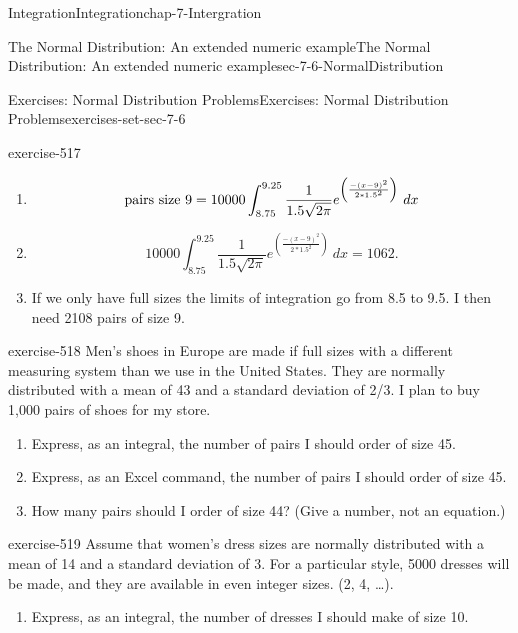 \documentclass[oneside,10pt,]{book}
\numberwithin{equation}{section}
\begin{document}
\begin{chapterptx}{Integration}{}{Integration}{}{}{chap-7-Intergration}
\begin{sectionptx}{The Normal Distribution: An extended numeric example}{}{The Normal Distribution: An extended numeric example}{}{}{sec-7-6-NormalDistribution}
\begin{exercises-subsection-numberless}{Exercises: Normal Distribution Problems}{}{Exercises: Normal Distribution Problems}{}{}{exercises-set-sec-7-6}
\begin{divisionexercise}{1}{}{}{exercise-517}
\leavevmode%
\begin{enumerate}[label=(\alph*)]
\textgreater{} \item\hypertarget{li-774}{}%
\begin{equation*}
\hbox{pairs size 9}=10000\int_{8.75}^{9.25}
\frac{1}{1.5\sqrt{2\pi}}e^{\left({\frac{-(x-9)^2}{2*1.5^2}}\right)}\ dx
\end{equation*}
%
\item\hypertarget{li-775}{}%
\begin{equation*}
10000\int_{8.75}^{9.25} \frac{1}{1.5\sqrt{2\pi}} e^{\left({\frac{-(x-9)^2}{2*1.5^2}}\right)}\ dx=1062.
\end{equation*}
%
\item\hypertarget{li-776}{}\hypertarget{p-2969}{}%
If we only have full sizes the limits of integration go from 8.5 to 9.5.  I then need 2108 pairs of size 9.%
\end{enumerate}
\end{divisionexercise}%
\begin{divisionexercise}{2}{}{}{exercise-518}%
\hypertarget{p-2970}{}%
Men's shoes in Europe are made if full sizes with a different measuring system than we use in the United States.  They are normally distributed with a mean of 43 and a standard deviation of 2\slash{}3.  I plan to buy 1,000 pairs of shoes for my store.%
\leavevmode%
\begin{enumerate}[label=(\alph*)]
\item\hypertarget{li-777}{}\hypertarget{p-2971}{}%
Express, as an integral, the number of pairs I should order of size 45.%
\item\hypertarget{li-778}{}\hypertarget{p-2972}{}%
Express, as an Excel command, the number of pairs I should order of size 45.%
\item\hypertarget{li-779}{}\hypertarget{p-2973}{}%
How many pairs should I order of size 44?  (Give a number, not an equation.)%
\end{enumerate}
\end{divisionexercise}%
\begin{divisionexercise}{3}{}{}{exercise-519}%
\hypertarget{p-2974}{}%
Assume that women’s dress sizes are normally distributed with a mean of 14 and a standard deviation of 3.  For a particular style, 5000 dresses will be made, and they are available in even integer sizes.  (2, 4, …).%
\leavevmode%
\begin{enumerate}[label=(\alph*)]
\item\hypertarget{li-780}{}\hypertarget{p-2975}{}%
Express, as an integral, the number of dresses I should make of size 10.%

\end{enumerate}
\end{divisionexercise}
\end{exercises-subsection-numberless}
\end{sectionptx}
\end{chapterptx}
\end{document}
